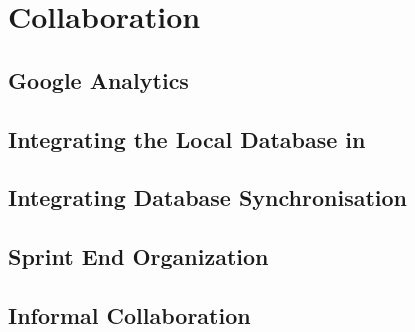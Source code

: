 \chapter{Collaboration}\label{chap:collaboration}


\section{Google Analytics}


\section{Integrating the Local Database in \launcher}\label{sec:collab:localdbtolauncher}


\section{Integrating Database Synchronisation}\label{sec:collab:remotedb}


\section{Sprint End Organization}\label{sec:collab:sprintend}


\section{Informal Collaboration}\label{sec:collab:adhoc}

